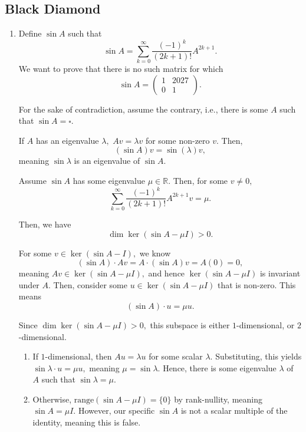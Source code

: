 \documentclass[12pt]{article}
\begin{document}
\subsection{Black Diamond}
\begin{enumerate}
  \item[12] Define $\sin A$ such that
    $$
    \sin A = \sum_{k = 0}^{\infty} \dfrac{(-1)^{k}}{(2k+1)!} A^{2k + 1}.
    $$
    We want to prove that there is no such matrix for which $$
    \sin A =
    \begin{pmatrix}
      1 & 2027 \\
      0 & 1
    \end{pmatrix}.
    $$

    For the sake of contradiction, assume the contrary, i.e., there
    is some $A$ such that $\sin A = \square$.

    If $A$ has an eigenvalue $\lambda,$ $Av = \lambda v$ for some
    non-zero $v.$ Then,
    $$
    (\sin A ) v = \sin(\lambda)v,
    $$
    meaning $\sin \lambda $ is an eigenvalue of $\sin A.$

    Assume $\sin A$ has some eigenvalue $\mu \in \mathbb R.$ Then,
    for some $v \neq 0,$ $$
    \sum_{k = 0}^{\infty} \dfrac{(-1)^k}{(2k+1)!} A^{2k+1} v = \mu.
    $$

    Then, we have $$
    \dim \ker \left(\sin A- \mu I\right) > 0.
    $$

    For some $v \in \ker (\sin A - I),$ we know $$(\sin A)  \cdot A v
    = A \cdot  (\sin A) v = A (0) = 0,$$
    meaning $Av  \in \ker(\sin A - \mu I),$ and hence $\ker (\sin A -
    \mu I)$ is invariant under $A.$ Then, consider some $u \in \ker
    (\sin A - \mu I)$ that is non-zero. This means
    $$
    (\sin A ) \cdot u = \mu  u.
    $$

    Since $\dim \ker (\sin A - \mu I) >0,$ this subspace is either
    $1$-dimensional, or $2$-dimensional.

    \begin{enumerate}
      \item If $1$-dimensional, then $Au = \lambda u$ for some scalar
        $\lambda.$ Substituting, this yields $\sin \lambda \cdot u =
        \mu u,$ meaning $\mu = \sin \lambda.$ Hence, there is some
        eigenvalue $\lambda$ of $A$ such that $\sin \lambda = \mu.$

      \item Otherwise, $\text{range}(\sin A - \mu I) = \{0\}$ by
        rank-nullity, meaning $\sin A = \mu I.$ However, our specific
        $\sin A$ is not a scalar multiple of the identity, meaning
        this is false.
    \end{enumerate}


\end{enumerate}
\end{document}
